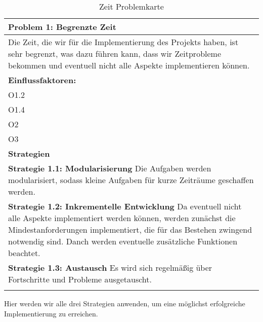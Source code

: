 \documentclass[fontsize=12pt,paper=a4,twoside]{scrartcl}
\begin{document}


\begin{table}[H]
    \centering
    \begin{tabular}{|p{15cm}|}
    \hline
          \textbf{Problem 1:} Begrenzte Zeit \\ \hline
         Die Zeit, die wir für die Implementierung des Projekts haben, ist sehr begrenzt, was dazu führen kann, dass wir Zeitprobleme bekommen und eventuell nicht alle Aspekte implementieren können. \\ \hline
          \textbf{Einflussfaktoren: } \\
		O1.2 \\
		O1.4 \\
		O2 \\
		O3 \\
          \hline
          \textbf{Strategien} \\ \hline
            {}          
           \label{strategie:1.1}     
          \textbf{Strategie 1.1: Modularisierung} Die Aufgaben werden modularisiert, sodass kleine Aufgaben für kurze Zeiträume geschaffen werden. \\        
  {}          
           \label{strategie:1.2}              
          \textbf{Strategie 1.2: Inkrementelle Entwicklung} Da eventuell nicht alle Aspekte implementiert werden können, werden zunächst die Mindestanforderungen implementiert, die für das Bestehen zwingend notwendig sind. Danch werden eventuelle zusätzliche Funktionen beachtet. \\
	 {}          
           \label{strategie:1.3}     
          \textbf{Strategie 1.3: Austausch} Es wird sich regelmäßig über Fortschritte und Probleme ausgetauscht. \\ 
	 \\ \hline
    \end{tabular}

    \caption{Zeit Problemkarte}
    \label{tab:ProblemKarte1}
\end{table}
Hier werden wir alle drei Strategien anwenden, um eine möglichst erfolgreiche Implementierung zu erreichen. \\
\end{document}
